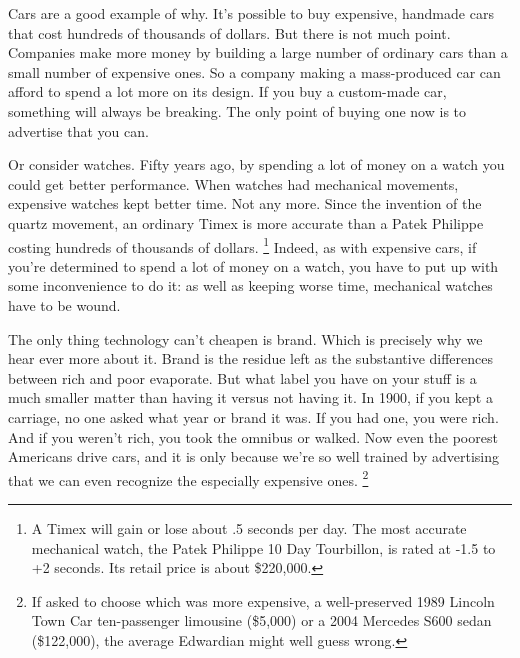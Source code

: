 \documentclass[12pt]{book}
\begin{document}
Cars are a good example of why. It's possible to buy expensive, handmade
cars that cost hundreds of thousands of dollars. But there is not much
point. Companies make more money by building a large number of ordinary
cars than a small number of expensive ones. So a company making a
mass-produced car can afford to spend a lot more on its design. If you
buy a custom-made car, something will always be breaking. The only point
of buying one now is to advertise that you can.

Or consider watches. Fifty years ago, by spending a lot of money on a
watch you could get better performance. When watches had mechanical
movements, expensive watches kept better time. Not any more. Since the
invention of the quartz movement, an ordinary Timex is more accurate
than a Patek Philippe costing hundreds of thousands of dollars.
\footnote{A Timex will gain or lose about .5 seconds per day. The most
accurate mechanical watch, the Patek Philippe 10 Day Tourbillon, is
rated at -1.5 to +2 seconds. Its retail price is about \$220,000.} Indeed, as with expensive cars, if you're
determined to spend a lot of money on a watch, you have to put up with
some inconvenience to do it: as well as keeping worse time, mechanical
watches have to be wound.

The only thing technology can't cheapen is brand. Which is precisely why
we hear ever more about it. Brand is the residue left as the substantive
differences between rich and poor evaporate. But what label you have on
your stuff is a much smaller matter than having it versus not having it.
In 1900, if you kept a carriage, no one asked what year or brand it was.
If you had one, you were rich. And if you weren't rich, you took the
omnibus or walked. Now even the poorest Americans drive cars, and it is
only because we're so well trained by advertising that we can even
recognize the especially expensive ones. \footnote{If asked to choose which was more expensive, a well-preserved
1989 Lincoln Town Car ten-passenger limousine (\$5,000) or a 2004
Mercedes S600 sedan (\$122,000), the average Edwardian might well guess
wrong.}
\end{document}
